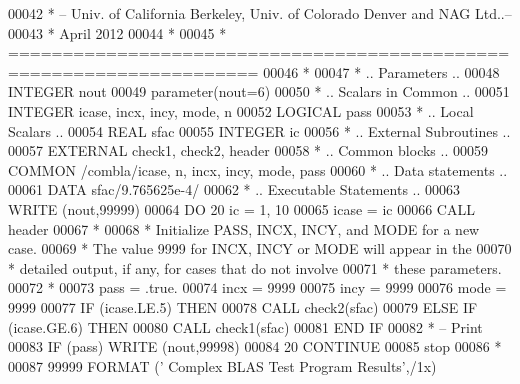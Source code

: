 \begin{DoxyCode}
00042 \textcolor{comment}{*  -- Univ. of California Berkeley, Univ. of Colorado Denver and NAG Ltd..--}
00043 \textcolor{comment}{*     April 2012}
00044 \textcolor{comment}{*}
00045 \textcolor{comment}{*  =====================================================================}
00046 \textcolor{comment}{*}
00047 \textcolor{comment}{*     .. Parameters ..}
00048       \textcolor{keywordtype}{INTEGER}          nout
00049       parameter(nout=6)
00050 \textcolor{comment}{*     .. Scalars in Common ..}
00051       \textcolor{keywordtype}{INTEGER}          icase, incx, incy, mode, n
00052       \textcolor{keywordtype}{LOGICAL}          pass
00053 \textcolor{comment}{*     .. Local Scalars ..}
00054       \textcolor{keywordtype}{REAL}             sfac
00055       \textcolor{keywordtype}{INTEGER}          ic
00056 \textcolor{comment}{*     .. External Subroutines ..}
00057       \textcolor{keywordtype}{EXTERNAL}         check1, check2, header
00058 \textcolor{comment}{*     .. Common blocks ..}
00059       \textcolor{keyword}{COMMON}           /combla/icase, n, incx, incy, mode, pass
00060 \textcolor{comment}{*     .. Data statements ..}
00061       \textcolor{keyword}{DATA}             sfac/9.765625e-4/
00062 \textcolor{comment}{*     .. Executable Statements ..}
00063       \textcolor{keyword}{WRITE} (nout,99999)
00064       \textcolor{keywordflow}{DO} 20 ic = 1, 10
00065          icase = ic
00066          \textcolor{keyword}{CALL }header
00067 \textcolor{comment}{*}
00068 \textcolor{comment}{*        Initialize PASS, INCX, INCY, and MODE for a new case.}
00069 \textcolor{comment}{*        The value 9999 for INCX, INCY or MODE will appear in the}
00070 \textcolor{comment}{*        detailed  output, if any, for cases that do not involve}
00071 \textcolor{comment}{*        these parameters.}
00072 \textcolor{comment}{*}
00073          pass = .true.
00074          incx = 9999
00075          incy = 9999
00076          mode = 9999
00077          \textcolor{keywordflow}{IF} (icase.LE.5) \textcolor{keywordflow}{THEN}
00078             \textcolor{keyword}{CALL }check2(sfac)
00079          \textcolor{keywordflow}{ELSE} \textcolor{keywordflow}{IF} (icase.GE.6) \textcolor{keywordflow}{THEN}
00080             \textcolor{keyword}{CALL }check1(sfac)
00081 \textcolor{keywordflow}{         END IF}
00082 \textcolor{comment}{*        -- Print}
00083          \textcolor{keywordflow}{IF} (pass) \textcolor{keyword}{WRITE} (nout,99998)
00084    20 \textcolor{keywordflow}{CONTINUE}
00085       stop
00086 \textcolor{comment}{*}
00087 99999 \textcolor{keyword}{FORMAT} (\textcolor{stringliteral}{' Complex BLAS Test Program Results'},/1x)

\end{DoxyCode}
